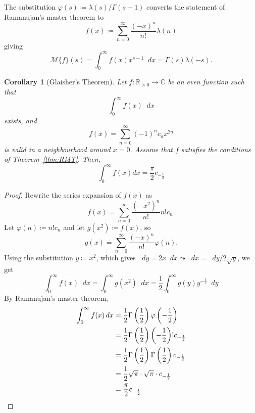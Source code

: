 \documentclass[a4paper]{article}
\newcommand*\diff{\mathop{}\!d} %
\newcommand{\R}{\mathbb{R}}
\newcommand{\C}{\mathbb{C}}
\newtheorem{corollary}{Corollary}[theorem]
\theoremstyle{definition}
\begin{document}
The substitution $\varphi(s) \coloneq \lambda(s)/\Gamma(s+1)$ converts the statement of Ramanujan's master theorem to
\begin{equation*}
    f(x) \coloneq \sum_{n=0}^\infty \frac{(-x)^n}{n!}\lambda(n)
\end{equation*}
giving
\begin{equation}
    \mathcal{M}\{f\}(s) = \int_0^\infty f(x) x^{s-1} \diff x = \Gamma(s) \lambda(-s).
\end{equation}
\begin{corollary}[Glaisher's Theorem]
    Let $f \colon \R_{>0} \to \C$ be an even function such that
    \begin{equation*}
        \int_0^{\infty}f(x) \diff x
    \end{equation*}
    exists, and
    \begin{equation*}
        f(x) = \sum_{n=0}^{\infty}(-1)^n c_n x^{2n}
    \end{equation*}
    is valid in a neighbourhood around $x=0$.
    Assume that $f$ satisfies the conditions of Theorem~\ref{thm:RMT}.
    Then,
    \begin{equation}
        \int_0^{\infty} f(x)dx = \frac{\pi}{2}c_{-\frac{1}{2}}
    \end{equation}
\end{corollary}
\begin{proof}
    Rewrite the series expansion of $f(x)$ as
    \begin{equation*}
        f(x) = \sum_{n=0}^{\infty} \frac{(-x^2)^n}{n!} n!c_n.
    \end{equation*}
    Let $\varphi(n) \coloneq n!c_n$ and let $g(x^2) \coloneq f(x)$, so
    \begin{equation*}
        g(x) = \sum_{n=0}^{\infty} \frac{(-x)^n}{n!} \varphi(n).
    \end{equation*}
    Using the substitution $y \coloneq x^2$, which gives $\diff y = 2x \diff x \leadsto \diff x = \diff y / 2\sqrt{y}$, we get
    \begin{equation*}
        \int_0^\infty f(x) \diff x = \int_0^\infty g(x^2) \diff x = \frac{1}{2}\int_0^\infty g(y) y^{-\frac{1}{2}} \diff y
    \end{equation*}
    By Ramanujan's master theorem,
    \begin{align*}
        \int_0^\infty f(x) \diff x & = \frac{1}{2}\Gamma\left( \frac{1}{2} \right) \varphi \left( -\frac{1}{2} \right)                \\
                                   & = \frac{1}{2} \Gamma\left( \frac{1}{2} \right) \left( -\frac{1}{2} \right)!c_{-\frac{1}{2}}      \\
                                   & = \frac{1}{2} \Gamma\left( \frac{1}{2} \right) \Gamma\left( \frac{1}{2} \right) c_{-\frac{1}{2}} \\
                                   & = \frac{1}{2} \sqrt{\pi} \cdot \sqrt{\pi} \cdot c_{-\frac{1}{2}}                                 \\
                                   & = \frac{\pi}{2} c_{-\frac{1}{2}}. \qedhere
    \end{align*}
\end{proof}
\end{document}
